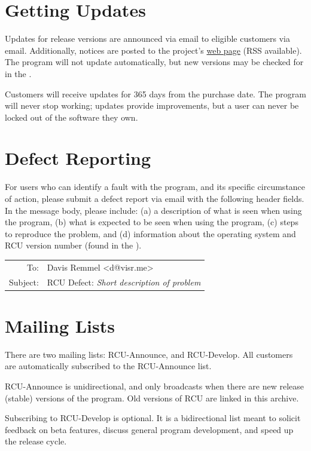 \documentclass{memoir}
\begin{document}
{\section{Getting Updates}

Updates for release versions are announced via email to eligible customers via email. Additionally, notices are posted to the project's \href{http://www.davisr.me/projects/rcu/}{web page} (RSS available). The program will not update automatically, but new versions may be checked for in the .

Customers will receive updates for 365 days from the purchase date. The program will never stop working; updates provide improvements, but a user can never be locked out of the software they own.


\section{Defect Reporting}

For users who can identify a fault with the program, and its specific circumstance of action, please submit a defect report via email with the following header fields. In the message body, please include: (a) a description of what is seen when using the program, (b) what is expected to be seen when using the program, (c) steps to reproduce the problem, and (d) information about the operating system and RCU version number (found in the ).

\vspace{0.5cm}
\begin{tabular}{rl}
To:& Davis Remmel \textless d@visr.me\textgreater \\
Subject:& RCU Defect: \textit{Short description of problem}
\end{tabular}


\section{Mailing Lists}
There are two mailing lists: RCU-Announce, and RCU-Develop. All customers are automatically subscribed to the RCU-Announce list.

RCU-Announce is unidirectional, and only broadcasts when there are new release (stable) versions of the program. Old versions of RCU are linked in this archive.

Subscribing to RCU-Develop is optional. It is a bidirectional list meant to solicit feedback on beta features, discuss general program development, and speed up the release cycle.

}
\end{document}
